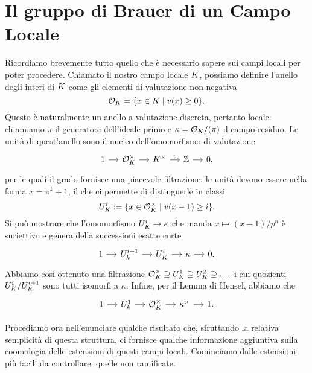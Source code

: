 \section{Il gruppo di Brauer di un Campo Locale}
Ricordiamo brevemente tutto quello che è necessario sapere sui campi locali per poter procedere. Chiamato il nostro campo locale $ K $, possiamo definire l'anello degli interi di $ K $ come gli elementi di valutazione non negativa
\[ \mathcal{O}_{K} = \{ x \in K \mid v(x)\geq 0 \}. \]
Questo è naturalmente un anello a valutazione discreta, pertanto locale: chiamiamo $ \pi $ il generatore dell'ideale primo e $ \kappa = \mathcal{O}_{K}/(\pi) $ il campo residuo. Le unità di quest'anello sono il nucleo dell'omomorfismo di valutazione
\begin{equation}\label{local1}
	\begin{tikzcd}[column sep = small]
	1 \rar
	& \mathcal{O}_{\K}^\times \rar
	& \K^\times \rar["v"]
	& \Z \rar
	& 0,
	\end{tikzcd}
\end{equation}
per le quali il grado fornisce una piacevole filtrazione: le unità devono essere nella forma $ x = \pi^k +1 $, il che ci permette di distinguerle in classi  $$  U_{K}^i :=\{x \in \mathcal{O}_{K}^\times \mid v(x-1) \geq i \}.  $$ Si può mostrare che l'omomorfismo $ U_{K}^i \to \kappa $ che manda $ x \mapsto (x-1)/p^n $ è suriettivo e genera della successioni esatte corte
\begin{equation}\label{local2}
\begin{tikzcd}[column sep = small]
1 \rar
& U_k^{i+1} \rar
& U_{\K}^i \rar
& \kappa \rar
& 0.
\end{tikzcd}
\end{equation}
Abbiamo così ottenuto una filtrazione $ \mathcal{O}_{K}^\times \supseteq U_{K}^1 \supseteq U_{K}^2 \supseteq \dots $ 
i cui quozienti $ U_{K}^i / U_{K}^{i+1} $ sono tutti isomorfi a $ \kappa $.
Infine, per il Lemma di Hensel, abbiamo che
\begin{equation}\label{local3}
	\begin{tikzcd}[column sep = small]
	1 \rar
	& U_k^{1} \rar
	& \mathcal{O}_{\K}^\times \rar
	& \kappa^\times \rar
	&1.
	\end{tikzcd}
\end{equation}


Procediamo ora nell'enunciare qualche risultato che, sfruttando la relativa semplicità di questa struttura, ci fornisce qualche informazione aggiuntiva sulla coomologia delle estensioni di questi campi locali. Cominciamo dalle estensioni più facili da controllare: quelle non ramificate.


